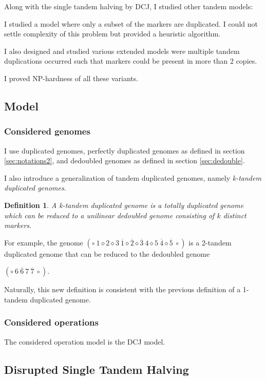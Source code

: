 \documentclass[11pt,final,twoside,nofrench]{thlifl}
\newcommand{\fst}[1]{ \ensuremath{#1} }
\newcommand{\snd}[1]{ \ensuremath{\overline{#1}} }
\newtheorem{definition}{Definition}
\begin{document}
Along with the single tandem halving by DCJ, I studied other tandem models:

I studied a model where only a subset of the markers are duplicated. I could not settle complexity of this problem but provided a heuristic algorithm.

I also designed and studied various extended models were multiple tandem duplications occurred such that markers could be present in more than 2 copies.

I proved NP-hardness of all these variants.

\subsection{Model}

\subsubsection{Considered genomes}

I use duplicated genomes, perfectly duplicated genomes as defined in section \ref{sec:notations2}, and dedoubled genomes as defined in section \ref{sec:dedouble}.

I also introduce a generalization of tandem duplicated genomes, namely \emph{k-tandem duplicated genomes}.

\begin{definition}
A \emph{k-tandem duplicated genome} is a totally duplicated genome which can
be reduced to a unilinear dedoubled genome consisting of $k$ distinct markers.
\end{definition}

For example, the genome
$(\circ~\fst{1}\diamond\fst{2}\diamond\fst{3}~\snd{1}\diamond\snd{2}\diamond\snd{3
}~\fst{4}\diamond\fst{5}~\snd{4}\diamond\snd{5}~\circ )$ is a 2-tandem
duplicated genome that can be reduced to the dedoubled genome 

$(\circ~\fst{6}~\snd{6}~\fst{7}~\snd{7}~\circ )$.

Naturally, this new definition is consistent with the previous definition of a 1-tandem duplicated genome.

\subsubsection{Considered operations}

The considered operation model is the DCJ model.

\subsection{Disrupted Single Tandem Halving}
\label{sec:disrupted}
\end{document}
